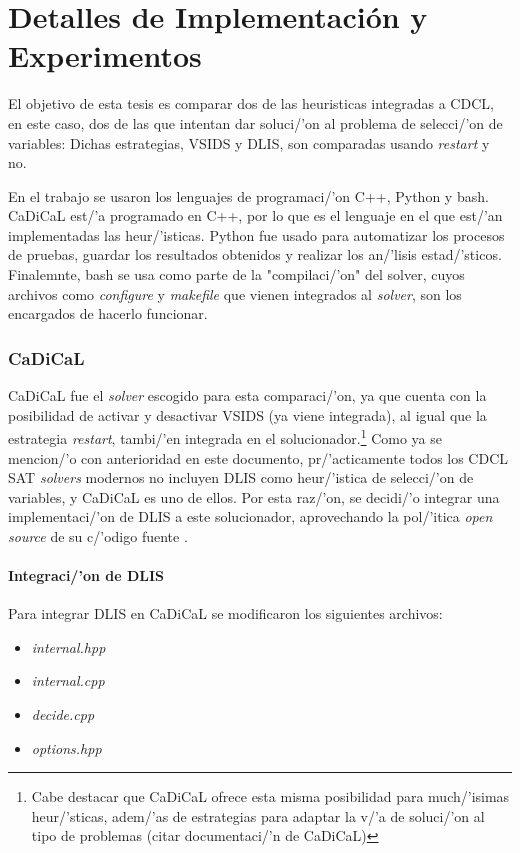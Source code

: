 \chapter{Detalles de Implementación y Experimentos}
\label{chapter:implementation}
El objetivo de esta tesis es comparar dos de las heuristicas integradas a CDCL, en este caso, dos de las que intentan dar soluci/'on al problema de selecci/'on de variables: Dichas estrategias, VSIDS y DLIS, son comparadas usando \textit{restart} y no.

En el trabajo se usaron los lenguajes de programaci/'on C++, Python y bash. CaDiCaL est/'a programado en C++, por lo que es el lenguaje en el que est/'an implementadas las heur/'isticas. Python fue usado para automatizar los procesos de pruebas, guardar los resultados obtenidos y realizar los an/'lisis estad/'sticos. Finalemnte, bash se usa como parte de la "compilaci/'on" del solver, cuyos archivos como \textit{configure} y \textit{makefile} que vienen integrados al \textit{solver}, son los encargados de hacerlo funcionar.

\subsection{CaDiCaL}
CaDiCaL fue el \textit{solver} escogido para esta comparaci/'on, ya que cuenta con la posibilidad de activar y desactivar VSIDS (ya viene integrada), al igual que la estrategia \textit{restart}, tambi/'en integrada en el solucionador.\footnote{Cabe destacar que CaDiCaL ofrece esta misma posibilidad para much/'isimas heur/'sticas, adem/'as de estrategias para adaptar la v/'a de soluci/'on al tipo de problemas (citar documentaci/'n de CaDiCaL)} Como ya se mencion/'o con anterioridad en este documento, pr/'acticamente todos los CDCL SAT \textit{solvers} modernos no incluyen DLIS como heur/'istica de selecci/'on de variables, y CaDiCaL es uno de ellos. Por esta raz/'on, se decidi/'o integrar una implementaci/'on de DLIS a este solucionador, aprovechando la pol/'itica \textit{open source} de su c/'odigo fuente \cite{cadical2024}.%

\subsubsection{Integraci/'on de DLIS}
Para integrar DLIS en CaDiCaL se modificaron los siguientes archivos:
\begin{itemize}
    \item \textit{internal.hpp}
    \item \textit{internal.cpp}
    \item \textit{decide.cpp}
    \item \textit{options.hpp}
\end{itemize}


